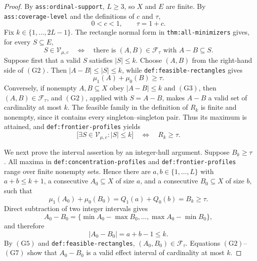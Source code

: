 \documentclass{article}
\begin{document}
\begin{proof}
By \texttt{ass:ordinal-support}, \(L\geq 3\), so \(X\) and \(E\) are finite.  By \texttt{ass:coverage-level} and the definitions of \(c\) and \(\tau\),
\[
0<c<1,\qquad \tau=1+c.
\tag{G1}
\]
Fix \(k\in\{1,\ldots,2L-1\}\).  The rectangle normal form in \texttt{thm:all-minimizers} gives, for every \(S\subseteq E\),
\[
S\in\mathcal V_{\mu,c}
\quad\Longleftrightarrow\quad
\text{there is }(A,B)\in\mathcal F_\tau\text{ with }A-B\subseteq S.
\tag{G2}
\]
Suppose first that a valid \(S\) satisfies \(|S|\leq k\).  Choose \((A,B)\) from the right-hand side of \((\mathrm{G2})\).  Then \(|A-B|\leq |S|\leq k\), while \texttt{def:feasible-rectangles} gives
\[
\mu_1(A)+\mu_0(B)\geq\tau.
\tag{G3}
\]
Conversely, if nonempty \(A,B\subseteq X\) obey \(|A-B|\leq k\) and \((\mathrm{G3})\), then \((A,B)\in\mathcal F_\tau\), and \((\mathrm{G2})\), applied with \(S=A-B\), makes \(A-B\) a valid set of cardinality at most \(k\).  The feasible family in the definition of \(R_k\) is finite and nonempty, since it contains every singleton--singleton pair.  Thus its maximum is attained, and \texttt{def:frontier-profiles} yields
\[
\bigl[\exists S\in\mathcal V_{\mu,c}:|S|\leq k\bigr]
\quad\Longleftrightarrow\quad R_k\geq\tau.
\tag{G4}
\]

We next prove the interval assertion by an integer-hull argument.  Suppose \(B_k\geq\tau\).  All maxima in \texttt{def:concentration-profiles} and \texttt{def:frontier-profiles} range over finite nonempty sets.  Hence there are \(a,b\in\{1,\ldots,L\}\) with \(a+b\leq k+1\), a consecutive \(A_0\subseteq X\) of size \(a\), and a consecutive \(B_0\subseteq X\) of size \(b\), such that
\[
\mu_1(A_0)+\mu_0(B_0)=Q_1(a)+Q_0(b)=B_k\geq\tau.
\tag{G5}
\]
Direct subtraction of two integer intervals gives
\[
A_0-B_0
=\{\min A_0-\max B_0,\ldots,\max A_0-\min B_0\},
\tag{G6}
\]
and therefore
\[
|A_0-B_0|=a+b-1\leq k.
\tag{G7}
\]
By \((\mathrm{G5})\) and \texttt{def:feasible-rectangles}, \((A_0,B_0)\in\mathcal F_\tau\).  Equations \((\mathrm{G2})\)--\((\mathrm{G7})\) show that \(A_0-B_0\) is a valid effect interval of cardinality at most \(k\).


\end{proof}
\end{document}
